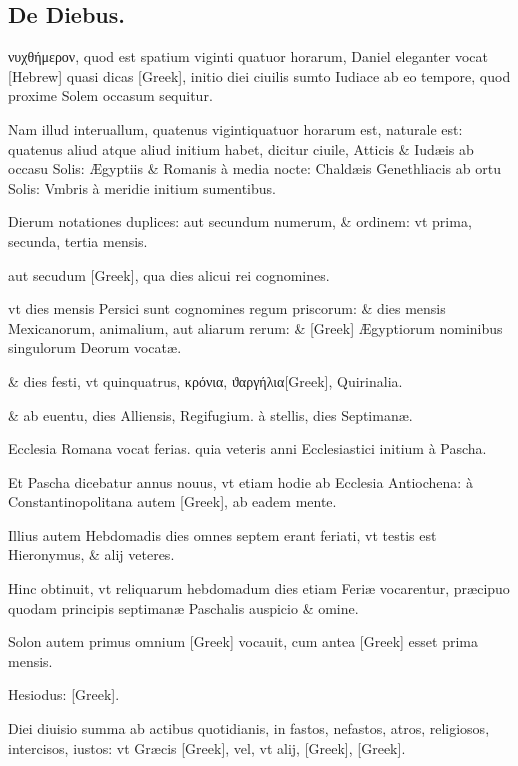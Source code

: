 \subsection{De Diebus.}
\setcounter{parcount}{0}
\begin{parnumbers}

\textgreek{νυχθήμερον},
quod est spatium viginti quatuor horarum, Daniel
eleganter vocat \texthebrew{[Hebrew]} quasi dicas
\textgreek{[Greek]}, initio diei ciuilis
sumto Iudiace ab eo tempore, quod proxime Solem occasum
sequitur.

Nam illud interuallum, quatenus vigintiquatuor horarum est,
naturale est: quatenus aliud atque aliud initium habet, dicitur ciuile,
Atticis \& Iudæis ab occasu Solis: Ægyptiis \& Romanis à media nocte:
Chaldæis Genethliacis ab ortu Solis: Vmbris à meridie initium
 sumentibus.

Dierum notationes duplices: aut secundum numerum, \&
ordinem: vt prima, secunda, tertia mensis.

aut secudum \textgreek{[Greek]},
qua dies alicui rei cognomines.

vt dies mensis Persici sunt cognomines
regum priscorum: \& dies mensis Mexicanorum, animalium, aut aliarum
rerum: \& \textgreek{[Greek]} Ægyptiorum nominibus singulorum Deorum
vocatæ.

\& dies festi, vt quinquatrus, \textgreek{κρόνια},
\textgreek{ϑαργήλια[Greek]}, Quirinalia.

\& ab euentu, dies Alliensis, Regifugium. à stellis, dies Septimanæ.

Ecclesia Romana vocat ferias. quia veteris anni Ecclesiastici initium
à Pascha.

Et Pascha dicebatur annus nouus, vt etiam hodie ab Ecclesia
Antiochena: à Constantinopolitana autem \textgreek{[Greek]},
ab eadem mente.

Illius autem Hebdomadis dies omnes septem erant 
feriati, vt testis est Hieronymus, \& alij veteres.

Hinc obtinuit, vt reliquarum
hebdomadum dies etiam Feriæ vocarentur, præcipuo quodam
principis septimanæ Paschalis auspicio \& omine.

Solon autem
primus omnium \textgreek{[Greek]} vocauit, cum antea \textgreek{[Greek]} esset
prima mensis.

Hesiodus: \textgreek{[Greek]}.

Diei diuisio summa ab actibus quotidianis, in fastos, nefastos, atros,
religiosos, intercisos, iustos: vt Græcis \textgreek{[Greek]}, vel, vt alij,
\textgreek{[Greek]}, \textgreek{[Greek]}.


\end{parnumbers}
